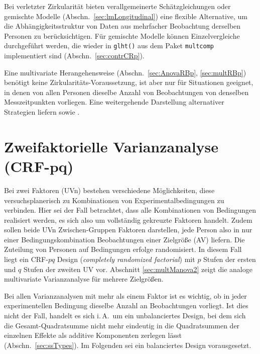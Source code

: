 Bei verletzter Zirkularität bieten verallgemeinerte Schätzgleichungen oder gemischte Modelle (Abschn.\ \ref{sec:lmLongitudinal}) eine flexible Alternative, um die Abhängigkeitsstruktur von Daten aus mehrfacher Beobachtung derselben Personen zu berücksichtigen. Für gemischte Modelle können Einzelvergleiche durchgeführt werden, die wieder in \lstinline!glht()! aus dem Paket \lstinline!multcomp! implementiert sind (Abschn.\ \ref{sec:contrCRp}).

Eine multivariate Herangehensweise (Abschn.\ \ref{sec:AnovaRBp}, \ref{sec:multRBp}) benötigt keine Zirkularitäts-Voraussetzung, ist aber nur für Situationen geeignet, in denen von allen Personen dieselbe Anzahl von Beobachtungen von denselben Messzeitpunkten vorliegen. Eine weitergehende Darstellung alternativer Strategien liefern  sowie .

\section[Zweifaktorielle Varianzanalyse (CRF-\texorpdfstring{$pq$}{pq})]{Zweifaktorielle Varianzanalyse (CRF-$\bm{pq}$)}
\label{sec:CRFpq}

Bei zwei Faktoren (UVn) bestehen verschiedene Möglichkeiten, diese versuchsplanerisch zu Kombinationen von Experimentalbedingungen zu verbinden. Hier sei der Fall betrachtet, dass alle Kombinationen von Bedingungen realisiert werden, es sich also um vollständig gekreuzte Faktoren handelt. Zudem sollen beide UVn Zwischen-Gruppen Faktoren darstellen, jede Person also in nur einer Bedingungskombination Beobachtungen einer Zielgröße (AV) liefern. Die Zuteilung von Personen auf Bedingungen erfolge randomisiert. In diesem Fall liegt ein CRF-$pq$ Design (\emph{completely randomized factorial}) mit $p$ Stufen der ersten und $q$ Stufen der zweiten UV vor. Abschnitt \ref{sec:multManova2} zeigt die analoge multivariate Varianzanalyse für mehrere Zielgrößen.

Bei allen Varianzanalysen mit mehr als einem Faktor ist es wichtig, ob in jeder experimentellen Bedingung dieselbe Anzahl an Beobachtungen vorliegt. Ist dies nicht der Fall, handelt es sich i.\,A.\ um ein unbalanciertes Design, bei dem sich die Gesamt-Quadratsumme nicht mehr eindeutig in die Quadratsummen der einzelnen Effekte als additive Komponenten zerlegen lässt (Abschn.\ \ref{sec:ssTypes}). Im Folgenden sei ein balanciertes Design vorausgesetzt.

